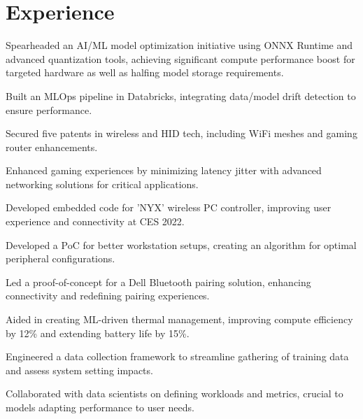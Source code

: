 \documentclass[]{resume-openfont}
\begin{document}
\begin{minipage}[t]{1\textwidth}
\section{Experience}
\titlerule
\vspace{2.5 mm}

\vspace{\topsep}
\begin{tightemize}
    \item Spearheaded an AI/ML model optimization initiative using ONNX Runtime and advanced quantization tools, achieving significant compute performance boost for targeted hardware as well as halfing model storage requirements.
    \item Built an MLOps pipeline in Databricks, integrating data/model drift detection to ensure performance.
    \item Secured five patents in wireless and HID tech, including WiFi meshes and gaming router enhancements.
    \item Enhanced gaming experiences by minimizing latency jitter with advanced networking solutions for critical applications.
    \item Developed embedded code for 'NYX' wireless PC controller, improving user experience and connectivity at CES 2022.
    \item Developed a PoC for better workstation setups, creating an algorithm for optimal peripheral configurations.    
\end{tightemize}
\sectionsep

\begin{tightemize}
    \item Led a proof-of-concept for a Dell Bluetooth pairing solution, enhancing connectivity and redefining pairing experiences.
    \item Aided in creating ML-driven thermal management, improving compute efficiency by 12\% and extending battery life by 15\%.
    \item Engineered a data collection framework to streamline gathering of training data and assess system setting impacts.
    \item Collaborated with data scientists on defining workloads and metrics, crucial to models adapting performance to user needs.
\end{tightemize}
\sectionsep


\end{minipage}
\end{document}

